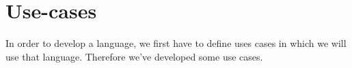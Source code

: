 \section{Use-cases}
In order to develop a language, we first have to define uses cases in which we
will use that language. Therefore we've developed some use cases.

